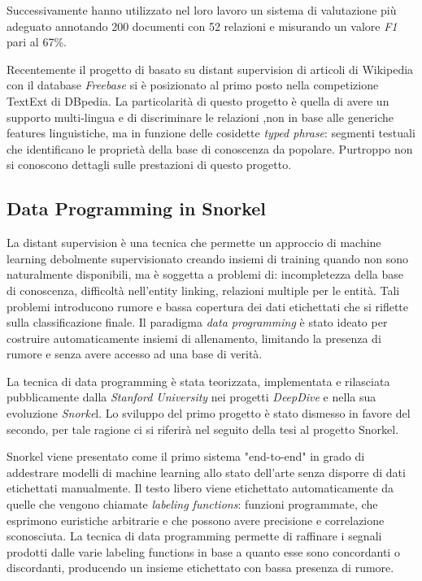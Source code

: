 Successivamente \citet{Nguyen2011EndtoEndRE} hanno utilizzato nel loro lavoro un sistema di valutazione più adeguato annotando 200 documenti con 52 relazioni e misurando un valore \textit{F1} pari al 67\%.

Recentemente il progetto di \citet{Cannaviccio2016AccurateFH} basato su distant supervision di articoli di Wikipedia con il database \textit{Freebase} si è posizionato al primo posto nella competizione TextExt di DBpedia. La particolarità di questo progetto è quella di avere un supporto multi-lingua e di discriminare le relazioni ,non in base alle generiche features linguistiche, ma in funzione delle cosidette \textit{typed phrase}: segmenti testuali che identificano le proprietà della base di conoscenza da popolare. Purtroppo non si conoscono dettagli sulle prestazioni di questo progetto.

\subsection{Data Programming in Snorkel}
\label{sec:literature_review:data_programming}

La distant supervision è una tecnica che permette un approccio di machine learning debolmente supervisionato creando insiemi di training quando non sono naturalmente disponibili, ma è soggetta a problemi di: incompletezza della base di conoscenza, difficoltà nell'entity linking, relazioni multiple per le entità. Tali problemi introducono rumore e bassa copertura dei dati etichettati che si riflette sulla classificazione finale.
Il paradigma \textit{data programming} \cite{Ratner2016DataPC, Ehrenberg2016DataPW,Bach2017LearningTS} è stato ideato per costruire automaticamente insiemi di allenamento, limitando la presenza di rumore e senza avere accesso ad una base di verità.
 
La tecnica di data programming è stata teorizzata, implementata e rilasciata pubblicamente dalla \textit{Stanford University} nei progetti \textit{DeepDive}\cite{Niu2012DeepDiveWK} e nella sua evoluzione \textit{Snorke}l\cite{Ratner2017SnorkelFT}. Lo sviluppo del primo progetto è stato dismesso in favore del secondo, per tale ragione ci si riferirà nel seguito della tesi al progetto Snorkel.

Snorkel viene presentato come il primo sistema "end-to-end" in grado di addestrare modelli di machine learning allo stato dell'arte senza disporre di dati etichettati manualmente. Il testo libero viene etichettato automaticamente da quelle che vengono chiamate \textit{labeling functions}: funzioni programmate, che esprimono euristiche arbitrarie e che possono avere precisione e correlazione sconosciuta. 
La tecnica di data programming permette di raffinare i segnali prodotti dalle varie labeling functions in base a quanto esse sono concordanti o discordanti, producendo un insieme etichettato con bassa presenza di rumore.

